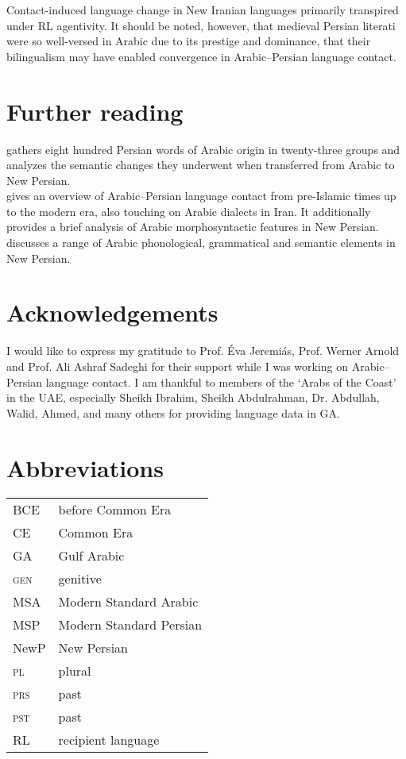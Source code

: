 \documentclass[output=paper]{langsci/langscibook}
\begin{document}
Contact-induced language change in New Iranian languages primarily transpired under RL agentivity. It should be noted, however, that medieval Persian literati were so well-versed in Arabic due to its prestige and dominance, that their bilingualism may have enabled convergence in Arabic–Persian language contact.

\section*{Further reading}

\citet{Asbaghi1987} gathers eight hundred Persian words of Arabic origin in twenty-three groups and analyzes the semantic changes they underwent when transferred from Arabic to New Persian.\\
\citet{Gazsi2011} gives an overview of Arabic–Persian language contact from pre-Islamic times up to the modern era, also touching on Arabic dialects in Iran. It additionally provides a brief analysis of Arabic morphosyntactic features in New Persian.\\
\citet{Ṣādiqī2011} discusses a range of Arabic phonological, grammatical and semantic elements in New Persian.

\section*{Acknowledgements}

I would like to express my gratitude to Prof. Éva Jeremiás, Prof. Werner Arnold and Prof. Ali Ashraf Sadeghi for their support while I was working on Arabic–Persian language contact. I am thankful to members of the ‘Arabs of the Coast’ in the UAE, especially Sheikh Ibrahim, Sheikh Abdulrahman, Dr. Abdullah, Walid, Ahmed, and many others for providing language data in GA.

\section*{Abbreviations}
\begin{tabularx}{.5\textwidth}{@{}lQ@{}}
BCE & before Common Era\\
CE & Common Era\\
GA & Gulf Arabic\\
\textsc{gen}   &  genitive\\
MSA &  Modern Standard Arabic\\
MSP  &  Modern Standard Persian\\
NewP   &  New Persian\\
\textsc{pl}   &  plural\\
\textsc{prs}   &  past\\
\textsc{pst}   &  past\\
RL &  recipient language \\
\end{tabularx}%



{\sloppy\printbibliography[heading=subbibliography,notkeyword=this]}
\end{document}
